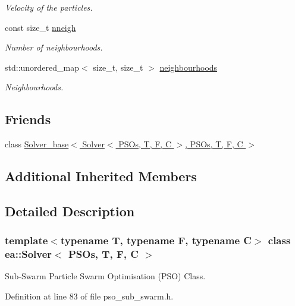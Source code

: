 \begin{DoxyCompactItemize}
\begin{DoxyCompactList}\small\item\em Velocity of the particles. \end{DoxyCompactList}\item 
const size\+\_\+t \hyperlink{classea_1_1_solver_3_01_p_s_os_00_01_t_00_01_f_00_01_c_01_4_a92980b9d3411dd8855a6a050722ebcf7}{nneigh}
\begin{DoxyCompactList}\small\item\em Number of neighbourhoods. \end{DoxyCompactList}\item 
std\+::unordered\+\_\+map$<$ size\+\_\+t, size\+\_\+t $>$ \hyperlink{classea_1_1_solver_3_01_p_s_os_00_01_t_00_01_f_00_01_c_01_4_a192926bdbed79d0cd68867c4f695cd92}{neighbourhoods}
\begin{DoxyCompactList}\small\item\em Neighbourhoods. \end{DoxyCompactList}\end{DoxyCompactItemize}
\subsection*{Friends}
\begin{DoxyCompactItemize}
\item 
class \hyperlink{classea_1_1_solver_3_01_p_s_os_00_01_t_00_01_f_00_01_c_01_4_aa3dcae3fc6bad98284e958b7c320549c}{Solver\+\_\+base$<$ Solver$<$ P\+S\+Os, T, F, C $>$, P\+S\+Os, T, F, C $>$}
\end{DoxyCompactItemize}
\subsection*{Additional Inherited Members}


\subsection{Detailed Description}
\subsubsection*{template$<$typename T, typename F, typename C$>$\newline
class ea\+::\+Solver$<$ P\+S\+Os, T, F, C $>$}

Sub-\/\+Swarm Particle Swarm Optimisation (P\+SO) Class. 

Definition at line 83 of file pso\+\_\+sub\+\_\+swarm.\+h.



